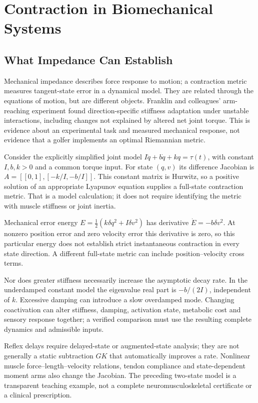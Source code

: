 \section{Contraction in Biomechanical Systems}

\subsection{What Impedance Can Establish}

Mechanical impedance describes force response to motion; a contraction metric measures tangent-state error in a dynamical model. They are related through the equations of motion, but are different objects. Franklin and colleagues' arm-reaching experiment \cite{Franklin2003Stiffness} found direction-specific stiffness adaptation under unstable interactions, including changes not explained by altered net joint torque. This is evidence about an experimental task and measured mechanical response, not evidence that a golfer implements an optimal Riemannian metric.

Consider the explicitly simplified joint model
$I\ddot q+b\dot q+kq=\tau(t)$, with constant $I,b,k>0$ and a common torque input. For state $(q,v)$ its difference Jacobian is $A=[[0,1],[-k/I,-b/I]]$. This constant matrix is Hurwitz, so a positive solution of an appropriate Lyapunov equation supplies a full-state contraction metric. That is a model calculation; it does not require identifying the metric with muscle stiffness or joint inertia.

Mechanical error energy $E=\tfrac12(k\delta q^2+I\delta v^2)$ has derivative $\dot E=-b\delta v^2$. At nonzero position error and zero velocity error this derivative is zero, so this particular energy does not establish strict instantaneous contraction in every state direction. A different full-state metric can include position--velocity cross terms.

Nor does greater stiffness necessarily increase the asymptotic decay rate. In the underdamped constant model the eigenvalue real part is $-b/(2I)$, independent of $k$. Excessive damping can introduce a slow overdamped mode. Changing coactivation can alter stiffness, damping, activation state, metabolic cost and sensory response together; a verified comparison must use the resulting complete dynamics and admissible inputs.

Reflex delays require delayed-state or augmented-state analysis; they are not generally a static subtraction $GK$ that automatically improves a rate. Nonlinear muscle force--length--velocity relations, tendon compliance and state-dependent moment arms also change the Jacobian. The preceding two-state model is a transparent teaching example, not a complete neuromusculoskeletal certificate or a clinical prescription.

